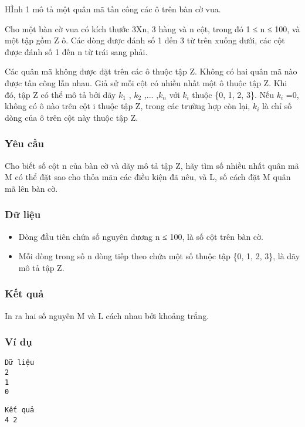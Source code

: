



   HÌnh 1 mô tả một quân mã tấn công các ô trên bàn cờ vua.  

   Cho một bàn cờ vua có kích thước 3Xn, 3 hàng và n cột, trong đó 1 ≤ n ≤ 100, và một tập gồm Z ô. Các dòng được đánh số 1 đến 3 từ   trên xuống dưới, các cột được đánh số 1 đến n từ trái sang phải.  

   Các quân mã không được đặt trên các ô thuộc tập Z. Không có hai quân mã nào được tấn công lẫn nhau. Giả sử mỗi cột có nhiều nhất một ô   thuộc tập Z. Khi đó, tập Z có thể mô tả bởi dãy $k_{1}$   , $k_{2}$   ,... ,$k_{n}$   với $k_{i}$   thuộc \{0, 1, 2, 3\}. Nếu   $k_{i}$   =0, không có ô nào trên cột i thuộc tập Z, trong các trường hợp còn lại, $k_{i}$   là chỉ số dòng của ô trên cột này thuộc   tập Z.  

\subsubsection{   Yêu cầu  }

   Cho biết số cột n của bàn cờ và dãy mô tả tập Z, hãy tìm số nhiều nhất quân mã M có thể đặt sao cho thỏa mãn các điều kiện đã nêu, và L,   số cách đặt M quân mã lên bàn cờ.  



\subsubsection{   Dữ liệu  }
\begin{itemize}
	\item     Dòng đầu tiên chứa số nguyên dương n ≤ 100, là số cột trên bàn cờ.   
	\item     Mỗi dòng trong số n dòng tiếp theo chứa một số thuộc tập \{0, 1, 2, 3\}, là dãy mô tả tập Z.   
\end{itemize}

\subsubsection{   Kết quả  }

   In ra hai số nguyên M và L cách nhau bởi khoảng trắng.  

\subsubsection{   Ví dụ  }
\begin{verbatim}
Dữ liệu
2
1
0
\end{verbatim}
\begin{verbatim}
Kết quả 
4 2
\end{verbatim}
